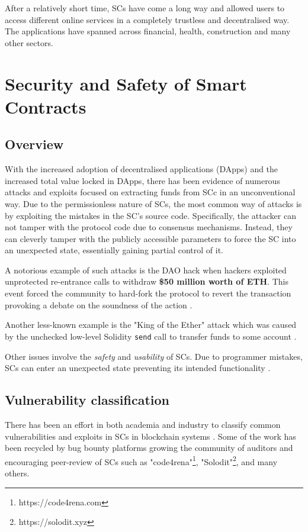 \documentclass[oneside]{ecsproject}     %
\begin{document}
After a relatively short time, SCs have come a long way and allowed users to access different online services in a completely trustless and decentralised way.
The applications have spanned across financial, health, construction and many other sectors. 

\chapter{Security and Safety of Smart Contracts}

\section{Overview}

With the increased adoption of decentralised applications (DApps) and the increased total value locked in DApps, 
there has been evidence of numerous attacks and exploits focused on extracting funds from SCc in an unconventional way. 
Due to the permissionless nature of SCs, the most common way of attacks is by exploiting the mistakes in the SC's source code.
Specifically, the attacker can not tamper with the protocol code due to consensus mechanisms. 
Instead, they can cleverly tamper with the publicly accessible parameters to force the SC into an unexpected state, essentially gaining partial control of it.

A notorious example of such attacks is the DAO hack when hackers exploited unprotected re-entrance calls to withdraw \textbf{\$50 million worth of ETH}. 
This event forced the community to hard-fork the protocol to revert the transaction provoking a debate on the soundness of the action \cite{the_dao}.

Another less-known example is the "King of the Ether" attack which was caused by the unchecked low-level Solidity \texttt{send} call to transfer funds to some account \cite{king_of_the_ether}.

Other issues involve the \textit{safety} and \textit{usability} of SCs. Due to programmer mistakes, SCs can enter an unexpected state preventing its intended functionality \cite{ondo_report}.


\section{Vulnerability classification}

There has been an effort in both academia and industry to classify common vulnerabilities 
and exploits in SCs in blockchain systems \cite{owasp}\cite{stefano}\cite{atzei_survey}. 
Some of the work has been recycled by bug bounty platforms growing the community of auditors
and encouraging peer-review of SCs such as "code4rena"\footnote{https://code4rena.com}, "Solodit"\footnote{https://solodit.xyz},
and many others.
\end{document}
